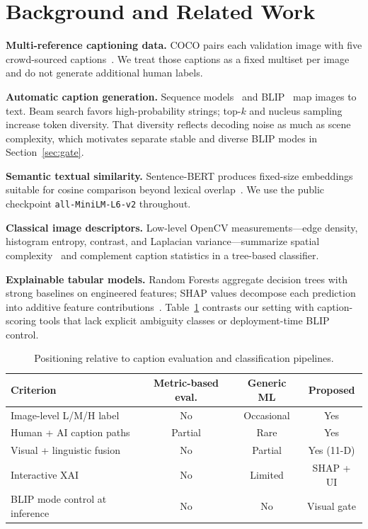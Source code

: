 \documentclass[conference]{IEEEtran}
\begin{document}
\section{Background and Related Work}
\label{sec:related}

\textbf{Multi-reference captioning data.}
COCO pairs each validation image with five crowd-sourced captions~\cite{lin2014coco}. We treat those captions as a fixed multiset per image and do not generate additional human labels.

\textbf{Automatic caption generation.}
Sequence models~\cite{vinyals2015show} and BLIP~\cite{li2022blip} map images to text. Beam search favors high-probability strings; top-$k$ and nucleus sampling increase token diversity. That diversity reflects decoding noise as much as scene complexity, which motivates separate stable and diverse BLIP modes in Section~\ref{sec:gate}.

\textbf{Semantic textual similarity.}
Sentence-BERT produces fixed-size embeddings suitable for cosine comparison beyond lexical overlap~\cite{reimers2019sentence}. We use the public checkpoint \texttt{all-MiniLM-L6-v2} throughout.

\textbf{Classical image descriptors.}
Low-level OpenCV measurements---edge density, histogram entropy, contrast, and Laplacian variance---summarize spatial complexity~\cite{szeliski2010} and complement caption statistics in a tree-based classifier.

\textbf{Explainable tabular models.}
Random Forests aggregate decision trees with strong baselines on engineered features; SHAP values decompose each prediction into additive feature contributions~\cite{lundberg2017shap}. Table~\ref{tab:related} contrasts our setting with caption-scoring tools that lack explicit ambiguity classes or deployment-time BLIP control.

\begin{table}[t]
\centering
\caption{Positioning relative to caption evaluation and classification pipelines.}
\label{tab:related}
\begin{tabular}{lccc}
\toprule
Criterion & Metric-based eval. & Generic ML & Proposed \\
\midrule
Image-level L/M/H label & No & Occasional & Yes \\
Human + AI caption paths & Partial & Rare & Yes \\
Visual + linguistic fusion & No & Partial & Yes (11-D) \\
Interactive XAI & No & Limited & SHAP + UI \\
BLIP mode control at inference & No & No & Visual gate \\
\bottomrule
\end{tabular}
\end{table}
\end{document}
